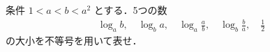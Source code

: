 \documentclass[8pt,dvipdfmx]{article}[b5paper]
\begin{document}
\begin{tcolorbox}[title=数学\textcircled{\scriptsize 2} 2-5 BC]
条件 $1 < a < b < a^2$ とする．5つの数
\begin{align*}
\log_a b, \quad \log_b a, \quad \log_a \frac{a}{b},  \quad \log_b \frac{b}{a}, \quad \frac{1}{2}
\end{align*}
の大小を不等号を用いて表せ．
\end{tcolorbox}




\end{document}
